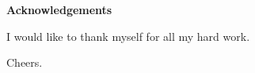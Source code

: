\thispagestyle{empty}

\begin{center}
    {\LARGE\bf Acknowledgements}
\end{center}

I would like to thank myself for all my hard work. 

Cheers. 
